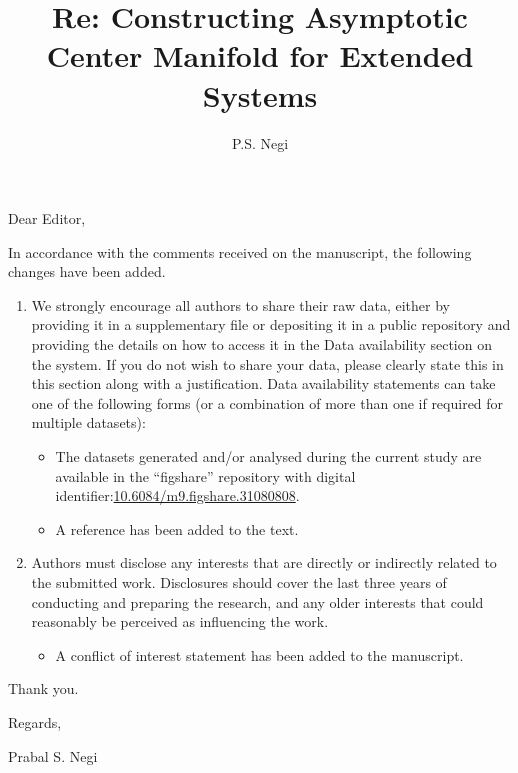 \documentclass[]{article}
\title{Re: Constructing Asymptotic Center Manifold for Extended Systems}
\author{P.S. Negi}
\date{}
\begin{document}
\maketitle

%

\section*{ }
Dear Editor,

In accordance with the comments received on the manuscript, the following changes have been added.

\vspace{0.5cm}

\begin{enumerate}
	\item We strongly encourage all authors to share their raw data, either by providing it in a supplementary file or depositing it in a public repository and providing the details on how to access it in the Data availability section on the system. If you do not wish to share your data, please clearly state this in this section along with a justification. Data availability statements can take one of the following forms (or a combination of more than one if required for multiple datasets):
	\begin{itemize}
		\item The datasets generated and/or analysed during the current study are available in the ``figshare'' repository with digital identifier:\linebreak \href{https://doi.org/10.6084/m9.figshare.31080808}{10.6084/m9.figshare.31080808}.
		\item A reference has been added to the text.
	\end{itemize}
	\item Authors must disclose any interests that are directly or indirectly related to the submitted work. Disclosures should cover the last three years of conducting and preparing the research, and any older interests that could reasonably be perceived as influencing the work.
	\begin{itemize}
		\item A conflict of interest statement has been added to the manuscript.
	\end{itemize}
\end{enumerate}

Thank you. 

\vspace{2em}
Regards,

Prabal S. Negi
\end{document}
